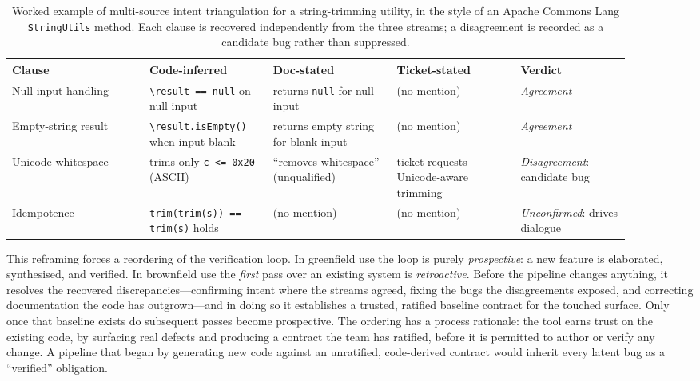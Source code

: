 \begin{table}[t]
\centering
\caption{Worked example of multi-source intent triangulation for a string-trimming utility, in the style of an Apache Commons Lang \texttt{StringUtils} method. Each clause is recovered independently from the three streams; a disagreement is recorded as a candidate bug rather than suppressed.}
\label{tab:a5-triangulation}
\small
\begin{tabular}{@{}p{0.20\linewidth}p{0.18\linewidth}p{0.18\linewidth}p{0.18\linewidth}p{0.16\linewidth}@{}}
\toprule
\textbf{Clause} & \textbf{Code-inferred} & \textbf{Doc-stated} & \textbf{Ticket-stated} & \textbf{Verdict} \\
\midrule
Null input handling &
\texttt{\textbackslash result == null} on null input &
returns \texttt{null} for null input &
(no mention) &
\emph{Agreement} \\[2pt]
Empty-string result &
\texttt{\textbackslash result.isEmpty()} when input blank &
returns empty string for blank input &
(no mention) &
\emph{Agreement} \\[2pt]
Unicode whitespace &
trims only \texttt{c <= 0x20} (ASCII) &
``removes whitespace'' (unqualified) &
ticket requests Unicode-aware trimming &
\emph{Disagreement}: candidate bug \\[2pt]
Idempotence &
\texttt{trim(trim(s)) == trim(s)} holds &
(no mention) &
(no mention) &
\emph{Unconfirmed}: drives dialogue \\
\bottomrule
\end{tabular}
\end{table}

This reframing forces a reordering of the verification loop. In greenfield use the loop is purely \emph{prospective}: a new feature is elaborated, synthesised, and verified. In brownfield use the \emph{first} pass over an existing system is \emph{retroactive}. Before the pipeline changes anything, it resolves the recovered discrepancies---confirming intent where the streams agreed, fixing the bugs the disagreements exposed, and correcting documentation the code has outgrown---and in doing so it establishes a trusted, ratified baseline contract for the touched surface. Only once that baseline exists do subsequent passes become prospective. The ordering has a process rationale: the tool earns trust on the existing code, by surfacing real defects and producing a contract the team has ratified, before it is permitted to author or verify any change. A pipeline that began by generating new code against an unratified, code-derived contract would inherit every latent bug as a ``verified'' obligation.

